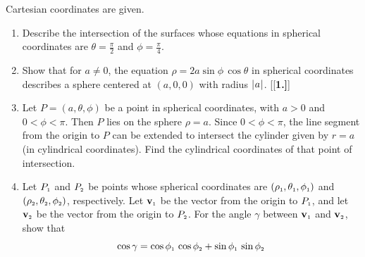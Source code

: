 Cartesian coordinates are given.
\begin{enumerate}[\bfseries 1.]
\par\noindent For Exercises 5-7, write the given equation in (a) cylindrical and (b) spherical coordinates.
[{[\bfseries 1.]}]
\vspace{1mm}
[{[\bfseries 1.]}]
 \item Describe the intersection of the surfaces whose equations in spherical coordinates are $\theta = \frac{\pi}{2}$
  and $\phi = \frac{\pi}{4}$.
 \item Show that for $a \ne 0$, the equation $\rho = 2a \sin \phi \, \cos \theta$ in spherical coordinates describes a
  sphere centered at $(a,0,0)$ with radius $\lvert\mspace{1mu}a\mspace{1mu}\rvert$.
[{[\bfseries 1.]}]
 \item Let $P = (a,\theta,\phi)$ be a point in spherical coordinates, with $a > 0$ and $0 < \phi < \pi$. Then $P$ lies
  on the sphere $\rho = a$. Since $0 < \phi < \pi$, the line segment from the origin to $P$
  can be extended to intersect the cylinder given by $r = a$ (in cylindrical coordinates). Find the cylindrical
  coordinates of that point of intersection.
 \item Let $P_{\scriptscriptstyle 1}$ and $P_{\scriptscriptstyle 2}$ be points whose spherical coordinates are
  $( \rho_{\scriptscriptstyle 1},\theta_{\scriptscriptstyle 1},\phi_{\scriptscriptstyle 1} )$ and $( \rho_{\scriptscriptstyle 2},\theta_{\scriptscriptstyle 2},\phi_{\scriptscriptstyle 2} )$,
  respectively. Let $\textbf{v}_{\scriptscriptstyle 1}$ be the vector from the origin to $P_{\scriptscriptstyle 1}$, and let
  $\textbf{v}_{\scriptscriptstyle 2}$ be the vector from the origin to $P_{\scriptscriptstyle 2}$. For the angle $\gamma$ between
  $\textbf{v}_{\scriptscriptstyle 1}$ and $\textbf{v}_{\scriptscriptstyle 2}$, show that
  \begin{displaymath}
   \cos \gamma = \cos \ssub{\phi}{1} \, \cos \ssub{\phi}{2} + \sin \ssub{\phi}{1} \, \sin \ssub{\phi}{2} \,

\end{displaymath}
\end{enumerate}
